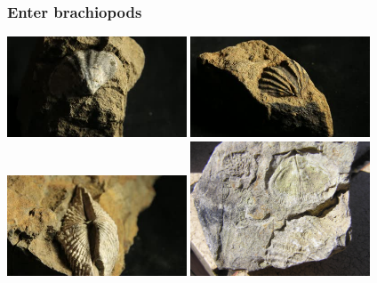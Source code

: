 \documentclass{beamer}
\begin{document}
\begin{frame}
  \frametitle{Enter brachiopods}
  \begin{center}
    \noindent
    \includegraphics[height = 0.5\textheight, width = 0.4\textwidth, keepaspectratio = true]{figure/stock-brac1}\hspace{0.2\textwidth}%
    \includegraphics[height = 0.5\textheight, width = 0.4\textwidth, keepaspectratio = true]{figure/stock-brac2}\\[2em]
    \includegraphics[height = 0.5\textheight, width = 0.4\textwidth, keepaspectratio = true]{figure/stock-brac3}\hspace{0.2\textwidth}%
    \includegraphics[height = 0.5\textheight, width = 0.4\textwidth, keepaspectratio = true]{figure/wiki_brac}\par

    \tiny{}
  \end{center}
\end{frame}
\end{document}
